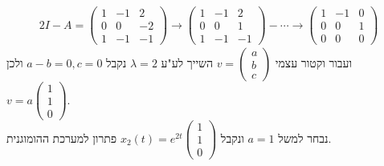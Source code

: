 \documentclass{article}
\begin{document}
\begin{align*}
    2I-A=\begin{pmatrix}
             1 & -1 & 2  \\
             0 & 0  & -2 \\
             1 & -1 & -1
         \end{pmatrix} \rightarrow \begin{pmatrix}
                                       1 & -1 & 2  \\
                                       0 & 0  & 1  \\
                                       1 & -1 & -1
                                   \end{pmatrix} - \cdots \rightarrow \begin{pmatrix}
                                                                          1 & -1 & 0 \\
                                                                          0 & 0  & 1 \\
                                                                          0 & 0  & 0
                                                                      \end{pmatrix}
\end{align*}
ועבור וקטור עצמי $v=\begin{pmatrix}
        a \\
        b \\
        c
    \end{pmatrix}$ השייך לע"ע $\lambda=2$ נקבל $a-b=0, c=0$ ולכן $v=a\begin{pmatrix}
        1 \\
        1 \\
        0
    \end{pmatrix}$. \\ נבחר למשל $a=1$ ונקבל $x_2(t)=e^{2t}\begin{pmatrix}
        1 \\
        1 \\
        0
    \end{pmatrix}$ פתרון למערכת ההומוגנית.
\end{document}
